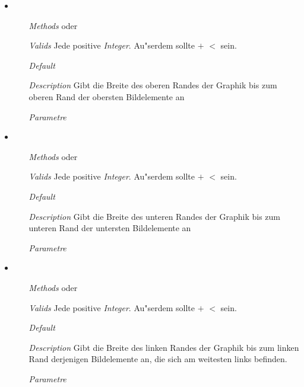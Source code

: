 \begin{description}
\begin{itemize}
\item {}
\begin{enumerate}
\item[\textit{Methods}] 
  oder 
\item[\textit{Valids}] Jede positive \textit{Integer}. Au"serdem
  sollte  $+$  $<$
   sein.
\item[\textit{Default}] 
\item[\textit{Description}] Gibt die Breite des oberen Randes der
  Graphik bis zum oberen Rand der obersten Bildelemente an
\item[\textit{Parametre}] 
\end{enumerate}

\item {}
\begin{enumerate}
\item[\textit{Methods}] 
  oder 
\item[\textit{Valids}] Jede positive \textit{Integer}. Au"serdem
  sollte  $+$  $<$
   sein.
\item[\textit{Default}] 
\item[\textit{Description}] Gibt die Breite des unteren Randes der
  Graphik bis zum unteren Rand der untersten Bildelemente an
\item[\textit{Parametre}] 
\end{enumerate}

\item {}
\begin{enumerate}
\item[\textit{Methods}] 
  oder 
\item[\textit{Valids}] Jede positive \textit{Integer}. Au"serdem
  sollte  $+$  $<$
   sein.
\item[\textit{Default}] 
\item[\textit{Description}] Gibt die Breite des linken Randes der
  Graphik bis zum linken Rand derjenigen Bildelemente an, die sich am
  weitesten links befinden.
\item[\textit{Parametre}] 
\end{enumerate}


\end{itemize}
\end{description}
